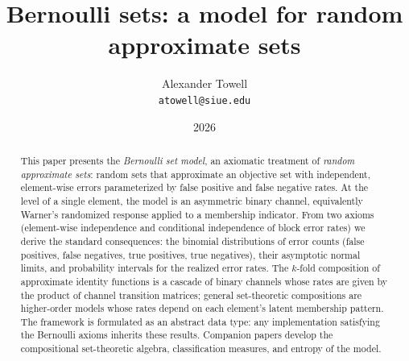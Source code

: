 \documentclass[11pt,final,hidelinks]{article}
\title
{
    Bernoulli sets: a model for random approximate sets
}
\author
{
    Alexander Towell\\
    \texttt{atowell@siue.edu}
}
\date{2026}
\numberwithin{equation}{section}
\begin{document}
\maketitle
\begin{abstract}
This paper presents the \emph{Bernoulli set model}, an axiomatic treatment of \emph{random approximate sets}: random sets that approximate an objective set with independent, element-wise errors parameterized by false positive and false negative rates.
At the level of a single element, the model is an asymmetric binary channel, equivalently Warner's randomized response applied to a membership indicator.
From two axioms (element-wise independence and conditional independence of block error rates) we derive the standard consequences: the binomial distributions of error counts (false positives, false negatives, true positives, true negatives), their asymptotic normal limits, and probability intervals for the realized error rates.
The $k$-fold composition of approximate identity functions is a cascade of binary channels whose rates are given by the product of channel transition matrices; general set-theoretic compositions are higher-order models whose rates depend on each element's latent membership pattern.
The framework is formulated as an abstract data type: any implementation satisfying the Bernoulli axioms inherits these results.
Companion papers develop the compositional set-theoretic algebra, classification measures, and entropy of the model.
\end{abstract}



\tableofcontents
{}








\appendices



\end{document}
